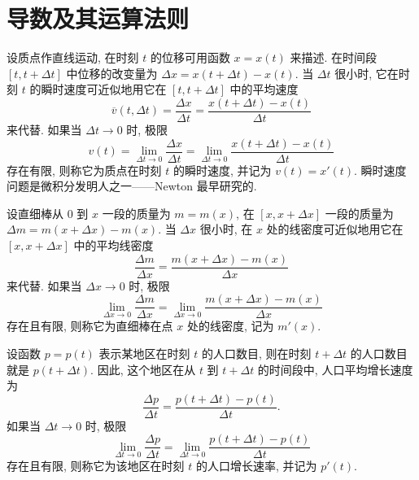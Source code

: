 \section{导数及其运算法则}\label{sec:3.1}

\begin{example}\label{ex:3.1.1}
设质点作直线运动, 在时刻 $t$ 的位移可用函数 $x = x(t)$ 来描述. 在时间段 $[t, t+\Delta t]$ 中位移的改变量为 $\Delta x = x(t+\Delta t) - x(t)$. 当 $\Delta t$ 很小时, 它在时刻 $t$ 的瞬时速度可近似地用它在 $[t, t+\Delta t]$ 中的平均速度
\[
\overline{v}(t,\Delta t) = \frac{\Delta x}{\Delta t} = \frac{x(t+\Delta t) - x(t)}{\Delta t}
\]
来代替. 如果当 $\Delta t \to 0$ 时, 极限
\[
v(t) = \lim_{\Delta t\to0}\frac{\Delta x}{\Delta t} = \lim_{\Delta t\to0}\frac{x(t+\Delta t) - x(t)}{\Delta t}
\]
存在有限, 则称它为质点在时刻 $t$ 的瞬时速度, 并记为 $v(t) = x'(t)$. 瞬时速度问题是微积分发明人之一——Newton 最早研究的.
\end{example}

\begin{example}\label{ex:3.1.2}
设直细棒从 $0$ 到 $x$ 一段的质量为 $m = m(x)$, 在 $[x, x+\Delta x]$ 一段的质量为 $\Delta m = m(x+\Delta x) - m(x)$. 当 $\Delta x$ 很小时, 在 $x$ 处的线密度可近似地用它在 $[x, x+\Delta x]$ 中的平均线密度
\[
\frac{\Delta m}{\Delta x} = \frac{m(x+\Delta x) - m(x)}{\Delta x}
\]
来代替. 如果当 $\Delta x \to 0$ 时, 极限
\[
\lim_{\Delta x\to0}\frac{\Delta m}{\Delta x} = \lim_{\Delta x\to0}\frac{m(x+\Delta x) - m(x)}{\Delta x}
\]
存在且有限, 则称它为直细棒在点 $x$ 处的线密度, 记为 $m'(x)$.
\end{example}

\begin{example}\label{ex:3.1.3}
设函数 $p = p(t)$ 表示某地区在时刻 $t$ 的人口数目, 则在时刻 $t+\Delta t$ 的人口数目就是 $p(t+\Delta t)$. 因此, 这个地区在从 $t$ 到 $t+\Delta t$ 的时间段中, 人口平均增长速度为
\[
\frac{\Delta p}{\Delta t} = \frac{p(t+\Delta t) - p(t)}{\Delta t}.
\]
如果当 $\Delta t \to 0$ 时, 极限
\[
\lim_{\Delta t\to0}\frac{\Delta p}{\Delta t} = \lim_{\Delta t\to0}\frac{p(t+\Delta t) - p(t)}{\Delta t}
\]
存在且有限, 则称它为该地区在时刻 $t$ 的人口增长速率, 并记为 $p'(t)$.
\end{example}

